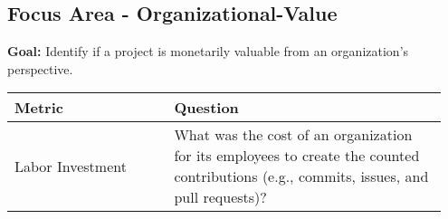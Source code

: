 
\subsection{Focus Area - Organizational-Value}
\textbf{Goal:} Identify if a project is monetarily valuable from an organization's perspective.
\begin{table}[ht!]
    \centering
    \begin{tabular}{|p{0.35\linewidth} | p{0.6\linewidth}|}
        \hline
        \hfil \textbf{Metric}  & \hfil \textbf{Question} \\
        \hline
		Labor Investment & What was the cost of an organization for its employees to create the counted contributions (e.g., commits, issues, and pull requests)? \\ 
		\hline
    \end{tabular}
\end{table}

 
